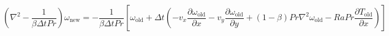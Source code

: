 \documentclass{article}
\begin{document}
\setcounter{equation}{12}
\begin{equation*}
    \left ( \nabla^2 - \frac{1}{\beta \Delta t Pr } \right ) \omega_{\text{new}} = - \frac{1}{\beta \Delta t Pr } \left [ \omega_{\text{old}} + \Delta t \left ( -v_x \frac{\partial \omega_{\text{old}}}{\partial x} -v_y \frac{\partial \omega_\text{old}}{\partial y} + (1 - \beta) Pr \nabla^2 \omega_{\text{old}} - Ra Pr \frac{\partial T_{\text{old}}}{\partial x} \right ) \right ]
\end{equation*}
\end{document}

